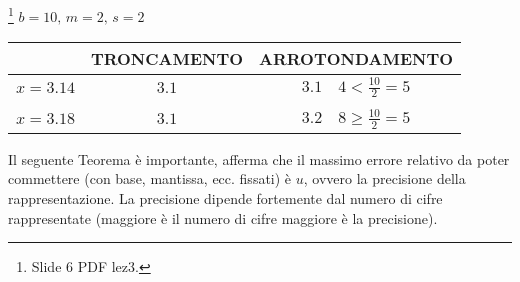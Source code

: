 \begin{example}\footnote{Slide 6 PDF lez3.}
	$b=10,\, m=2,\, s=2$
	\begin{center}
		\begin{tabular}{c|cc}
			& TRONCAMENTO & ARROTONDAMENTO\\
			\hline
			$x=3.14$ & $3.1$ & $3.1\quad 4<\frac{10}{2}=5$\\\\
			$x=3.18$ & $3.1$ & $3.2 \quad 8 \geq \frac{10}{2}=5$
		\end{tabular}
	\end{center}
\end{example}

Il seguente Teorema è importante, afferma che il massimo errore relativo da poter commettere (con base, mantissa, ecc. fissati) è $u$, ovvero la precisione della rappresentazione. La precisione dipende fortemente dal numero di cifre rappresentate (maggiore è il numero di cifre maggiore è la precisione).

